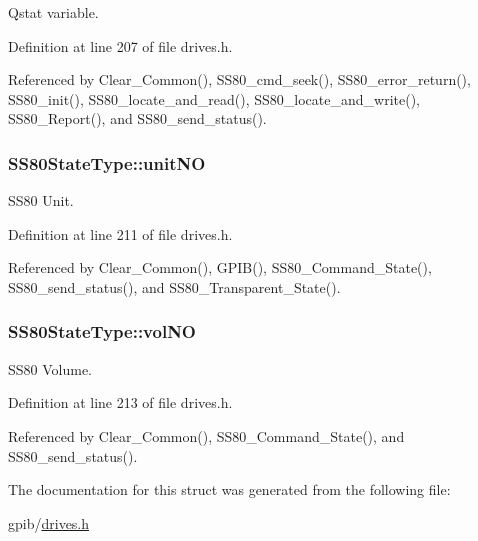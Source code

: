 Qstat variable. 



Definition at line 207 of file drives.\+h.



Referenced by Clear\+\_\+\+Common(), S\+S80\+\_\+cmd\+\_\+seek(), S\+S80\+\_\+error\+\_\+return(), S\+S80\+\_\+init(), S\+S80\+\_\+locate\+\_\+and\+\_\+read(), S\+S80\+\_\+locate\+\_\+and\+\_\+write(), S\+S80\+\_\+\+Report(), and S\+S80\+\_\+send\+\_\+status().

\subsubsection[{\texorpdfstring{unit\+NO}{unitNO}}]{ S\+S80\+State\+Type\+::unit\+NO}\hypertarget{structSS80StateType_ad2b3cd5353f5650df931520a39b385e7}{}\label{structSS80StateType_ad2b3cd5353f5650df931520a39b385e7}


S\+S80 Unit. 



Definition at line 211 of file drives.\+h.



Referenced by Clear\+\_\+\+Common(), G\+P\+I\+B(), S\+S80\+\_\+\+Command\+\_\+\+State(), S\+S80\+\_\+send\+\_\+status(), and S\+S80\+\_\+\+Transparent\+\_\+\+State().

\subsubsection[{\texorpdfstring{vol\+NO}{volNO}}]{ S\+S80\+State\+Type\+::vol\+NO}\hypertarget{structSS80StateType_ac197866db7677ec4bf9ad5e29e4a58a3}{}\label{structSS80StateType_ac197866db7677ec4bf9ad5e29e4a58a3}


S\+S80 Volume. 



Definition at line 213 of file drives.\+h.



Referenced by Clear\+\_\+\+Common(), S\+S80\+\_\+\+Command\+\_\+\+State(), and S\+S80\+\_\+send\+\_\+status().



The documentation for this struct was generated from the following file\+:\begin{DoxyCompactItemize}
\item 
gpib/\hyperlink{drives_8h}{drives.\+h}\end{DoxyCompactItemize}
